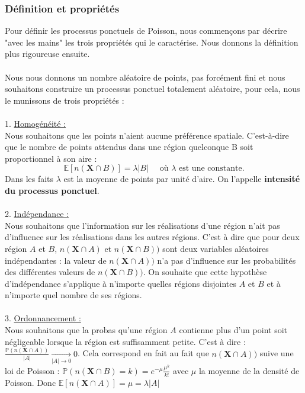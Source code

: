 \documentclass[12pt]{article}
\begin{document}
\subsubsection*{Définition et propriétés}
Pour définir les processus ponctuels de Poisson, nous commençons par décrire "avec les mains" les trois propriétés qui le caractérise. Nous donnons la définition plus rigoureuse ensuite.\\
\\
Nous nous donnons un nombre aléatoire de points, pas forcément fini et nous souhaitons construire un processus ponctuel totalement aléatoire, pour cela, nous le munissons de trois propriétés :\\
\\
1. \underline{Homogénéité :}\\
Nous souhaitons que les points n'aient aucune préférence spatiale. C'est-à-dire que le nombre de points attendus dans une région quelconque B soit proportionnel à son aire : 
\[
\mathbb{E}[n(\textbf{X}\cap B)] = \lambda|B| \quad \text{ où } \lambda \text{ est une constante.} 
\]
\newline
Dans les faits $\lambda$ est la moyenne de points par unité d'aire. On l'appelle \textbf{intensité du processus ponctuel}.\\
\\
2. \underline{Indépendance :}\\
Nous souhaitons que l'information sur les réalisations d'une région n'ait pas d'influence sur les réalisations dans les autres régions. C'est à dire que pour deux région $A$ et $B$, $n(\textbf{X}\cap A)$ et $n(\textbf{X}\cap B))$ sont deux variables aléatoires indépendantes : la valeur de $n(\textbf{X}\cap A))$ n'a pas d’influence sur les probabilités des différentes valeurs de $n(\textbf{X}\cap B))$. On souhaite que cette hypothèse d'indépendance s'applique à n'importe quelles régions disjointes $A$ et $B$ et à n'importe quel nombre de ses régions.\\
\\
3. \underline{Ordonnancement :}\\
Nous souhaitons que la probas qu'une région $A$ contienne plus d'un point soit négligeable lorsque la région est suffisamment petite. C'est à dire :
$\frac{\mathbb{P}(n(\textbf{X}\cap A))}{|A|} \underset{|A|\to 0 }{\longrightarrow} 0$.  Cela correspond en fait au fait que $n(\textbf{X}\cap A))$ suive une loi de Poisson : $\mathbb{P}(n(\textbf{X}\cap B)=k) = e^{-\mu}\frac{\mu^k}{k!}$ avec $\mu$ la moyenne de la densité de Poisson. Donc $\mathbb{E}[n(\textbf{X}\cap A)] = \mu = \lambda|A|$\\
\end{document}
